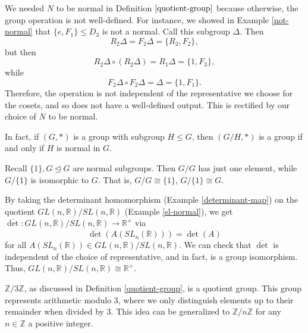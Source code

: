 \documentclass{amsart}
\begin{document}
\begin{example}
	We needed \(N\) to be normal in Definition \(\ref{quotient-group}\) because
	otherwise, the group operation is not well-defined. For instance, we showed in
	Example \ref{not-normal} that \(\{e, F_1\}\le D_3\) is not a normal. Call this
	subgroup \(\Delta\). Then 
	\[
		R_2\Delta = F_2\Delta = \{R_2, F_2\}, 
	\] 
	but then
	\[
		R_2\Delta\circ(R_2\Delta) = R_1\Delta = \{1, F_3\},
	\]
	while 
	\[
		F_2\Delta\circ F_2\Delta = \Delta = \{1, F_1\}.
	\]
	Therefore, the operation is not independent of the representative we choose
	for the cosets, and so does not have a well-defined output. This is rectified
	by our choice of \(N\) to be normal.  
\end{example}

\begin{remark}
   In fact, if \((G, \ast)\) is a group with subgroup \(H\le G\), then \((G/H,
	\ast)\) is a group if and only if \(H\) is normal in \(G\).
\end{remark}

\begin{example}
	Recall \(\{1\}, G\trianglelefteq G\) are normal subgroups. Then \(G/G\) has
	just one element, while \(G/\{1\}\) is isomorphic to \(G\). That is, \(G /
	G\cong \{1\}\), \(G/\{1\}\cong G\).
\end{example}

\begin{example}
	By taking the determinant homomorphism (Example \ref{determinant-map}) on
	the quotient \(GL(n, \mathbb{R})/SL(n, \mathbb{R})\) (Example
	\ref{sl-normal}), we get \(\overline{\det}: GL(n, \mathbb{R})/SL(n,
	\mathbb{R})\to\mathbb{R}^\times\) via 
	\[
		\overline{\det}(A(SL_n(\mathbb{R}))) = \det(A)
	\]
	for all \(A(SL_n(\mathbb{R}))\in GL(n, \mathbb{R})/SL(n, \mathbb{R})\).
	We can check that \(\overline{\det}\) is independent of the choice of
	representative, and in fact, is a group isomorphism. Thus, \(GL(n,
	\mathbb{R})/SL(n, \mathbb{R})\cong\mathbb{R}^\times\).
\end{example}

\begin{example}
	\(\mathbb{Z}/3\mathbb{Z}\), as discussed in Definition \ref{quotient-group},
	is a quotient group. This group represents arithmetic modulo \(3\), where we
	only distinguish elements up to their remainder when divided by \(3\). This
	idea can be generalized to \(\mathbb{Z}/n\mathbb{Z}\) for any
	\(n\in\mathbb{Z}\) a positive integer.
\end{example}
\end{document}
